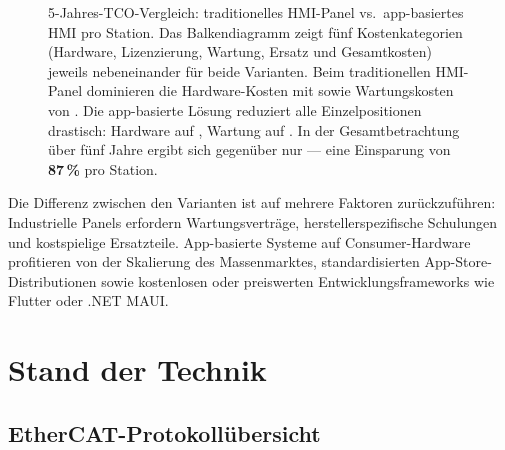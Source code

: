 ﻿\documentclass[12pt,a4paper]{article}
\begin{document}
\begin{figure}[H]
\centering
{}
\caption{5-Jahres-TCO-Vergleich: traditionelles HMI-Panel vs.\ app-basiertes HMI pro
  Station. Das Balkendiagramm zeigt fünf Kostenkategorien (Hardware, Lizenzierung,
  Wartung, Ersatz und Gesamtkosten) jeweils nebeneinander für beide Varianten. Beim
  traditionellen HMI-Panel dominieren die Hardware-Kosten mit  sowie
  Wartungskosten von . Die app-basierte Lösung reduziert alle
  Einzelpositionen drastisch: Hardware auf , Wartung auf . In der
  Gesamtbetrachtung über fünf Jahre ergibt sich  gegenüber nur 
  --- eine Einsparung von \textbf{87\,\%} pro Station.}
\label{fig:cost_comparison}
\end{figure}

Die Differenz zwischen den Varianten ist auf mehrere Faktoren zurückzuführen: Industrielle
Panels erfordern Wartungsverträge, herstellerspezifische Schulungen und kostspielige
Ersatzteile. App-basierte Systeme auf Consumer-Hardware profitieren von der Skalierung
des Massenmarktes, standardisierten App-Store-Distributionen sowie kostenlosen oder
preiswerten Entwicklungsframeworks wie Flutter oder .NET MAUI.

\section{Stand der Technik}
\label{sec:sota}

\subsection{EtherCAT-Protokollübersicht}
\end{document}
